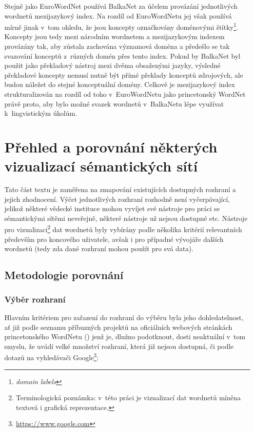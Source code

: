\documentclass[a4paper, 11pt, oneside, showtrims]{book}
\begin{document}
				Stejně jako EuroWordNet používá BalkaNet za účelem provázání jednotlivých wordnetů mezijazykový index. Na rozdíl od EuroWordNetu jej však používá mírně jinak v~tom ohledu, že jsou koncepty označkovány doménovými štítky\footnote{\textit{domain labels}}. Koncepty jsou tedy mezi národním wordnetem a mezijazykovým indexem provázány tak, aby zůstala zachována významová doména a předešlo se tak svazování konceptů z~různých domén přes tento index. Pokud by BalkaNet byl použit jako překladový nástroj mezi dvěma obsaženými jazyky, výsledné překladové koncepty nemusí nutně být přímé překlady konceptů zdrojových, ale budou náležet do stejné konceptuální domény. \parencite{christodoulakis2002balkanet} Celkově je mezijazykový index strukturalizován na rozdíl od toho v~EuroWordNetu jako princetonský WordNet právě proto, aby bylo možné svazek wordnetů v~BalkaNetu lépe využívat k~lingvistickým úkolům. \parencite{tufis2004balkanet}

	\part{Přehled a porovnání některých vizualizací sémantických sítí}
	\label{part:zwei}

		{\noindent Tato část textu je zaměřena na zmapování existujících dostupných rozhraní a jejich zhodnocení. Výčet jednotlivých rozhraní rozhodně není vyčerpávající, jelikož některé vědecké instituce mohou vyvíjet své nástroje pro práci se sémantickými sítěmi neveřejně, některé nástroje už nejsou dostupné etc. Nástroje pro vizualizaci\footnote{Terminologická poznámka: v~této práci je vizualizací dat wordnetů míněna textová i grafická reprezentace.} dat wordnetů byly vybírány podle několika kritérií relevantních především pro koncového uživatele, avšak i pro případné vývojáře dalších wordnetů (tedy zda dané rozhraní mohou použít pro svá data).}

		\chapter{Metodologie porovnání}

			\section{Výběr rozhraní}

				Hlavním kritériem pro zařazení do rozhraní do výběru byla jeho dohledatelnost, ať již podle seznamu příbuzných projektů na oficiálních webových stránkách princetonského WordNetu (\textcite{princetonWN}) jenž je, dlužno podotknout, dosti neaktuální v~tom smyslu, že uvádí velké množství rozhraní, která již nejsou dostupná, či podle dotazů na vyhledávači Google\footnote{\url{https://www.google.com}}:
\end{document}
